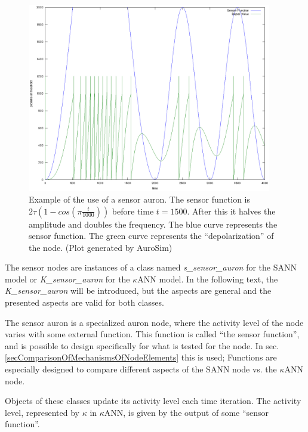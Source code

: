 \begin{figure}[hbt!p]
	\centering
	\includegraphics[width=0.95\textwidth]{sensorAuron.eps}
	\caption{Example of the use of a sensor auron. The sensor function is \mbox{$2\tau (1-cos(\pi \frac{t}{1000}))$} before time $t=1500$. After this it halves the amplitude and doubles the frequency.
			The blue curve represents the sensor function. The green curve represents the ``depolarization'' of the node. (Plot generated by AuroSim)} 
	\label{figSensorAuronExample}
\end{figure}

	The sensor nodes are instances of a class named \emph{s\_sensor\_auron} for the SANN model or \emph{K\_sensor\_auron} for the $\kappa$ANN model.
	In the following text, the \emph{K\_sensor\_auron} will be introduced, but the aspects are general and the presented aspects are valid for both classes. %

 	The sensor auron is a specialized auron node, where the activity level of the node varies with some external function.
	This function is called ``the sensor function'', and is possible to design specifically for what is tested for the node.
	In sec. \ref{secComparisonOfMechanismsOfNodeElements} this is used;
		Functions are especially designed to compare different aspects of the SANN node vs. the $\kappa$ANN node. %

	Objects of these classes update its activity level each time iteration.
	The activity level, represented by $\kappa$ in $\kappa$ANN, is given by the output of some ``sensor function''.


